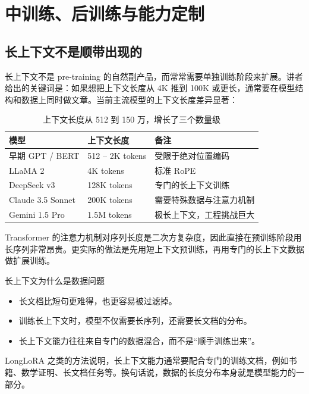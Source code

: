 \section{中训练、后训练与能力定制}

\subsection{长上下文不是顺带出现的}

长上下文不是 pre-training 的自然副产品，而常常需要单独训练阶段来扩展。讲者给出的关键词是：如果想把上下文长度从 4K 推到 100K 或更长，通常要在模型结构和数据上同时做文章。当前主流模型的上下文长度差异显著：

\begin{table}[H]
\centering
\begin{tabular}{p{}p{}p{}}
\toprule
\textbf{模型} & \textbf{上下文长度} & \textbf{备注} \\
\midrule
早期 GPT / BERT & 512 -- 2K tokens & 受限于绝对位置编码 \\
LLaMA 2 & 4K tokens & 标准 RoPE \\
DeepSeek v3 & 128K tokens & 专门的长上下文训练 \\
Claude 3.5 Sonnet & 200K tokens & 需要特殊数据与注意力机制 \\
Gemini 1.5 Pro & 1.5M tokens & 极长上下文，工程挑战巨大 \\
\bottomrule
\end{tabular}
\caption{上下文长度从 512 到 150 万，增长了三个数量级}
\end{table}

Transformer 的注意力机制对序列长度是二次方复杂度，因此直接在预训练阶段用长序列非常昂贵。更实际的做法是先用短上下文预训练，再用专门的长上下文数据做扩展训练。

\begin{knowledgebox}{长上下文为什么是数据问题}
\begin{itemize}
    \item 长文档比短句更难得，也更容易被过滤掉。
    \item 训练长上下文时，模型不仅需要长序列，还需要长文档的分布。
    \item 长上下文能力往往来自专门的数据混合，而不是“顺手训练出来”。
\end{itemize}
\end{knowledgebox}

LongLoRA 之类的方法说明，长上下文能力通常要配合专门的训练文档，例如书籍、数学证明、长文档任务等。换句话说，数据的长度分布本身就是模型能力的一部分。

